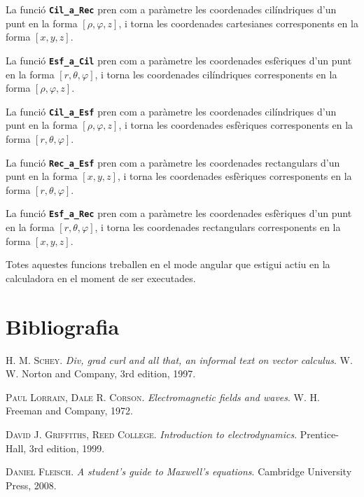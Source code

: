 \documentclass[catalan,a4paper,twoside,11pt]{article}
\begin{document}
La funció \texttt{\textbf{Cil\_a\_Rec}} pren com a paràmetre les coordenades cilíndriques d'un punt en la forma $[\rho,\varphi,z]$, i torna les coordenades cartesianes corresponents en la forma  $[x,y,z]$.


La funció \texttt{\textbf{Esf\_a\_Cil}} pren com a paràmetre les coordenades esfèriques d'un punt en la forma $[r, \theta,\varphi]$, i torna les coordenades cilíndriques corresponents en la forma  $[\rho,\varphi,z]$.


La funció \texttt{\textbf{Cil\_a\_Esf}} pren com a paràmetre les coordenades cilíndriques  d'un punt en la forma $[\rho,\varphi,z]$, i torna les coordenades esfèriques corresponents en la forma $[r,\theta,\varphi]$.


La funció \texttt{\textbf{Rec\_a\_Esf}} pren com a paràmetre les coordenades rectangulars  d'un punt en la forma $[x,y,z]$, i torna les coordenades esfèriques corresponents en la forma $[r,\theta,\varphi]$.


La funció \texttt{\textbf{Esf\_a\_Rec}} pren com a paràmetre les coordenades esfèriques d'un punt en la forma $[r,\theta,\varphi]$, i torna les coordenades rectangulars corresponents en la forma $[x,y,z]$.



Totes aquestes funcions treballen en el mode angular que estigui actiu en la calculadora en el moment de ser executades.



\section{Bibliografia}

\textsc{H. M. Schey}. \textsl{Div, grad curl and all that, an informal text on vector calculus}.  W. W. Norton and Company, 3rd edition, 1997.

\textsc{Paul Lorrain, Dale R. Corson}. \textsl{Electromagnetic fields and waves}.  W. H. Freeman and Company, 1972.

\textsc{David J. Griffiths, Reed College}. \textsl{Introduction to electrodynamics}. Prentice-Hall, 3rd edition, 1999.

\textsc{Daniel Fleisch}. \textsl{A student's guide to Maxwell's equations}. Cambridge University Press, 2008.
\end{document}

